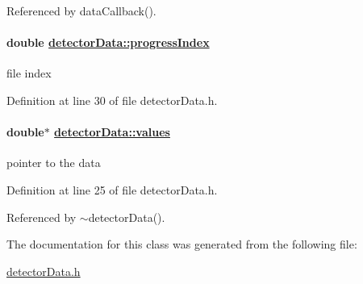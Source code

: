 Referenced by data\-Callback().\hypertarget{classdetectorData_976b3287d46aed032487bbeed74132da}{
\paragraph[progressIndex]{\setlength{\rightskip}{0pt plus 5cm}double \hyperlink{classdetectorData_976b3287d46aed032487bbeed74132da}{detector\-Data::progress\-Index}}\hfill}
\label{classdetectorData_976b3287d46aed032487bbeed74132da}


file index 



Definition at line 30 of file detector\-Data.h.\hypertarget{classdetectorData_0f4e31d65f9616e83a2e5521453d0364}{
\paragraph[values]{\setlength{\rightskip}{0pt plus 5cm}double$\ast$ \hyperlink{classdetectorData_0f4e31d65f9616e83a2e5521453d0364}{detector\-Data::values}}\hfill}
\label{classdetectorData_0f4e31d65f9616e83a2e5521453d0364}


pointer to the data 



Definition at line 25 of file detector\-Data.h.

Referenced by $\sim$detector\-Data().

The documentation for this class was generated from the following file:\begin{CompactItemize}
\item 
\hyperlink{detectorData_8h}{detector\-Data.h}\end{CompactItemize}
